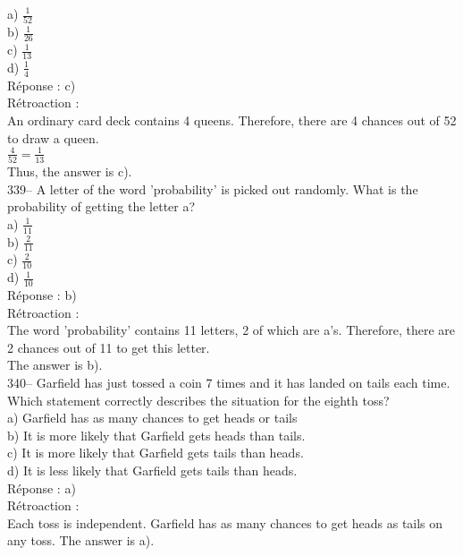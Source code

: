 \documentclass[letterpaper, 12pt]{article}
\begin{document}
a) $\frac{1}{52}$\\[2mm]
b) $\frac{1}{26}$\\[2mm]
c) $\frac{1}{13}$\\[2mm]
d) $\frac{1}{4}$\\

R\'eponse : c)\\

R\'etroaction : \\
An ordinary card deck contains 4 queens. Therefore, there are 4 chances out of 52 to draw a queen.\\[2mm]
$\frac{4}{52}=\frac{1}{13}$\\[2mm]
Thus, the answer is c).\\

339-- A letter of the word 'probability' is picked out randomly. What is the probability of getting the letter a?\\

a) $\frac{1}{11}$\\[2mm]
b) $\frac{2}{11}$\\[2mm]
c) $\frac{2}{10}$\\[2mm]
d) $\frac{1}{10}$\\

R\'eponse : b)\\

R\'etroaction : \\
The word 'probability' contains 11 letters, 2 of which are a's. Therefore, there are 2 chances out of 11 to get this letter.\\[2mm]
The answer is b).\\

340-- Garfield has just tossed a coin 7 times and it has landed on tails each time. Which statement correctly describes the situation for the eighth toss?\\

a) Garfield has as many chances to get heads or tails\\
b) It is more likely that Garfield gets heads than tails.\\
c) It is more likely that Garfield gets tails than heads.\\
d) It is less likely that Garfield gets tails than heads.\\

R\'eponse : a)\\

R\'etroaction : \\
Each toss is independent. Garfield has as many chances to get heads as tails on any toss. The answer is a).\\
\end{document}
